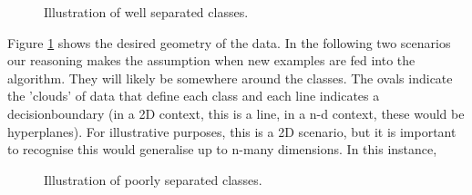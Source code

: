\begin{figure}[ht]
\caption{Illustration of well separated classes.} 
\label{fig:good_sep_classes} %
\end{figure}

Figure \ref{fig:good_sep_classes} shows the desired geometry of the data. In the following two scenarios our reasoning makes the assumption when new examples are fed into the algorithm. They will likely be somewhere around the classes. The ovals indicate the 'clouds' of data that define each class and each line indicates a \gls{decisionboundary} (in a 2D context, this is a line, in a n-d context, these would be \gls{hyperplane}s).  For illustrative purposes, this is a 2D scenario, but it is important to recognise this would generalise up to n-many dimensions.  In this instance, 

\begin{figure}[ht]
\caption{Illustration of poorly separated classes.}
\label{fig:poor_sep_classes}
\end{figure}

